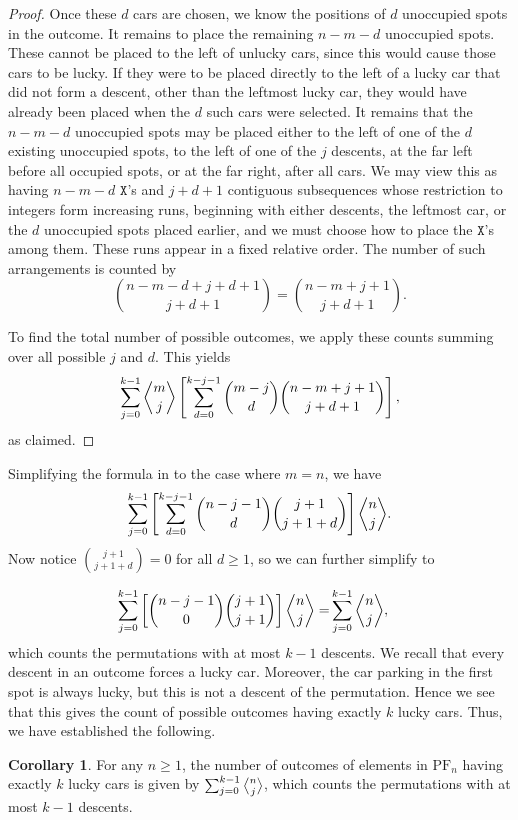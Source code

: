 \documentclass[reqno]{amsart}
\newcommand{\X}{\texttt{X}}
\newcommand{\PF}{\mathrm{PF}}
\theoremstyle{definition}
\newtheorem{corollary}{Corollary}[theorem]
\theoremstyle{remark}
\begin{document}
\begin{proof}
Once these $d$ cars are chosen, we know the positions of $d$ unoccupied spots in the outcome. It remains to place the remaining $n-m-d$ unoccupied spots. These cannot be placed to the left of unlucky cars, since this would cause those cars to be lucky. If they were to be placed directly to the left of a lucky car that did not form a descent, other than the leftmost lucky car, they would have already been placed when the $d$ such cars were selected. It remains that the $n-m-d$ unoccupied spots may be placed either to the left of one of the $d$ existing unoccupied spots, to the left of one of the $j$ descents, at the far left before all occupied spots, or at the far right, after all cars. We may view this as having $n-m-d$ $\X$'s and $j+d+1$ {contiguous subsequences whose restriction to integers form increasing runs}, beginning with either descents, the leftmost car, or the $d$ unoccupied spots placed earlier, and we must choose how to place the $\X$'s among them. These runs appear in a fixed relative order. The number of such arrangements is counted by \[ \binom{n-m-d+j+d+1}{j+d+1} = \binom{n-m+j+1}{j+d+1}.\]


To find the total number of possible outcomes, we apply these counts summing over all possible $j$ and $d$. This yields
\[
    \sum_{j=0}^{k-1} \genfrac{\langle}{\rangle}{0pt}{}{m}{j} \left[\sum_{d=0}^{k-j-1} \binom{m-j }{d} \binom{n-m+j+1}{ j+d+1} \right],
\]  
as claimed.
\end{proof}

Simplifying the formula in  to the case where $m=n$, we have
\begin{align}
\label{eq:1}\sum_{j=0}^{k-1}\left[\sum_{d=0}^{k-j-1}\binom{n-j-1}{d}\binom{j+1}{j+1+d}\right]\genfrac{\langle}{\rangle}{0pt}{}{n}{j}.\end{align}
Now notice $\binom{j+1}{j+1+d}=0$ for all $d\geq 1$, so we can further simplify  to

\begin{align*}
\sum_{j=0}^{k-1}\left[\binom{n-j-1}{0}\binom{j+1}{j+1}\right]\genfrac{\langle}{\rangle}{0pt}{}{n}{j}=&\sum_{j=0}^{k-1}\genfrac{\langle}{\rangle}{0pt}{}{n}{j},
\end{align*}
which counts the permutations with at most $k-1$  descents. We recall that every descent in an outcome forces a lucky car. Moreover, the car parking in the first spot is always lucky, but this is not a descent of the permutation. Hence we see that this gives the count of possible outcomes having exactly $k$ lucky cars. Thus, we have established the following.
\begin{corollary}
    For any $n\geq 1$, the number of outcomes of elements in $\PF_n$ having exactly $k$ lucky cars is given by 
    $\sum_{j=0}^{k-1}\genfrac{\langle}{\rangle}{0pt}{}{n}{j}$,
which counts the permutations with at most $k-1$  descents.
\end{corollary}
\end{document}
